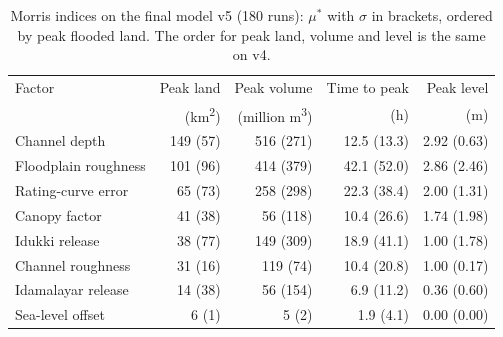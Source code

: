 \documentclass[preprint,12pt,authoryear]{elsarticle}
\newcommand{\kmsq}{km\textsuperscript{2}}
\newcommand{\Mcm}{million m\textsuperscript{3}}
\begin{document}
\begin{table}[htbp]
\centering
\caption{Morris indices on the final model v5 (180 runs): $\mu^*$ with $\sigma$ in brackets, ordered by peak flooded land. The order for peak land, volume and level is the same on v4.}
\label{tab:morris}
\footnotesize
\begin{tabular}{@{}lrrrr@{}}
\toprule
Factor & Peak land & Peak volume & Time to peak & Peak level \\
 & (\kmsq) & (\Mcm) & (h) & (m) \\
\midrule
Channel depth & 149 (57) & 516 (271) & 12.5 (13.3) & 2.92 (0.63) \\
Floodplain roughness & 101 (96) & 414 (379) & 42.1 (52.0) & 2.86 (2.46) \\
Rating-curve error & 65 (73) & 258 (298) & 22.3 (38.4) & 2.00 (1.31) \\
Canopy factor & 41 (38) & 56 (118) & 10.4 (26.6) & 1.74 (1.98) \\
Idukki release & 38 (77) & 149 (309) & 18.9 (41.1) & 1.00 (1.78) \\
Channel roughness & 31 (16) & 119 (74) & 10.4 (20.8) & 1.00 (0.17) \\
Idamalayar release & 14 (38) & 56 (154) & 6.9 (11.2) & 0.36 (0.60) \\
Sea-level offset & 6 (1) & 5 (2) & 1.9 (4.1) & 0.00 (0.00) \\
\bottomrule
\end{tabular}
\end{table}
\end{document}
